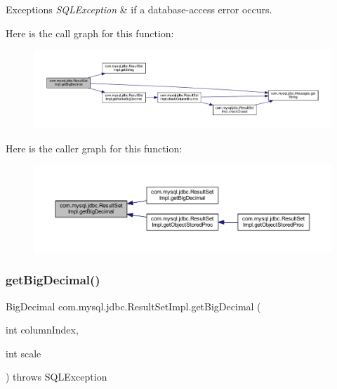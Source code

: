 \begin{DoxyExceptions}{Exceptions}
{\em S\+Q\+L\+Exception} & if a database-\/access error occurs. \\
\hline
\end{DoxyExceptions}
Here is the call graph for this function\+:
\nopagebreak
\begin{figure}[H]
\begin{center}
\leavevmode
\includegraphics[width=350pt]{classcom_1_1mysql_1_1jdbc_1_1_result_set_impl_a9a92d1b3d8bb0aaf7dce5b5c6b225bd9_cgraph}
\end{center}
\end{figure}
Here is the caller graph for this function\+:
\nopagebreak
\begin{figure}[H]
\begin{center}
\leavevmode
\includegraphics[width=350pt]{classcom_1_1mysql_1_1jdbc_1_1_result_set_impl_a9a92d1b3d8bb0aaf7dce5b5c6b225bd9_icgraph}
\end{center}
\end{figure}
\mbox{\label{classcom_1_1mysql_1_1jdbc_1_1_result_set_impl_a8e04cde19c0b2817791ffb7a2c8fe576}} 
\subsubsection{\texorpdfstring{get\+Big\+Decimal()}{getBigDecimal()}\hspace{0.1cm}{\footnotesize\ttfamily [2/4]}}
{\footnotesize\ttfamily Big\+Decimal com.\+mysql.\+jdbc.\+Result\+Set\+Impl.\+get\+Big\+Decimal (\begin{DoxyParamCaption}\item[{int}]{column\+Index,  }\item[{int}]{scale }\end{DoxyParamCaption}) throws S\+Q\+L\+Exception}

